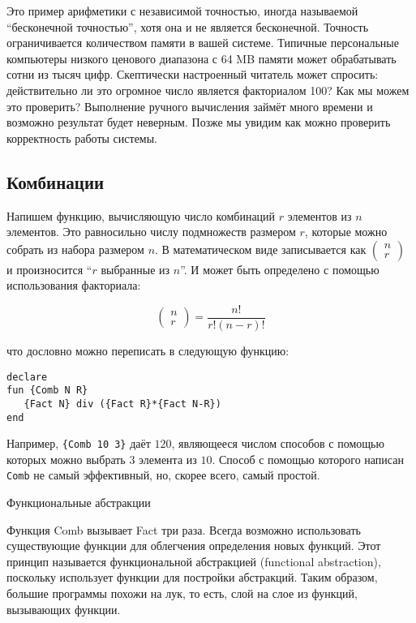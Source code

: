 Это пример арифметики с независимой точностью, иногда называемой ``бесконечной точностью'', хотя она и не является бесконечной. Точность ограничивается количеством памяти в вашей системе. Типичные персональные компьютеры низкого ценового диапазона с 64 MB памяти может обрабатывать сотни из тысяч цифр. Скептически настроенный читатель может спросить: действительно ли это огромное число является факториалом 100? Как мы можем это проверить? Выполнение ручного вычисления займёт много времени и возможно результат будет неверным. Позже мы увидим как можно проверить корректность работы системы.

\subsection{Комбинации}

Напишем функцию, вычисляющую число комбинаций $r$ элементов из $n$ элементов. Это равносильно числу подмножеств размером $r$, которые можно собрать из набора размером $n$. В математическом виде записывается как $\begin{pmatrix} n \\ r \end{pmatrix}$ и произносится ``$r$ выбранные из $n$''. И может быть определено с помощью использования факториала:

$$
\begin{pmatrix} n \\ r \end{pmatrix} = \frac{n!}{r! (n - r)!}
$$

что дословно можно переписать в следующую функцию:

\begin{lstlisting}
declare
fun {Comb N R}
   {Fact N} div ({Fact R}*{Fact N-R})
end
\end{lstlisting}

Например, \lstinline|{Comb 10 3}| даёт $120$, являющееся числом способов с помощью которых можно выбрать $3$ элемента из $10$. Способ с помощью которого написан \lstinline|Comb| не самый эффективный, но, скорее всего, самый простой.

Функциональные абстракции

Функция Comb вызывает Fact три раза. Всегда возможно использовать существующие функции для облегчения определения новых функций. Этот принцип называется функциональной абстракцией (functional abstraction), поскольку использует функции для постройки абстракций. Таким образом, большие программы похожи на лук, то есть, слой на слое из функций, вызывающих функции.

